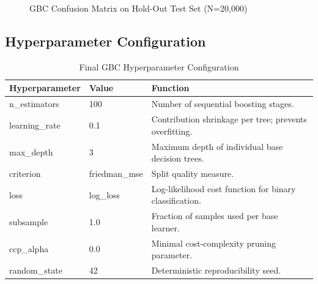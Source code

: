 \documentclass[12pt,a4paper]{report}
\begin{document}
\begin{figure}[H]
\centering
{}
\caption{GBC Confusion Matrix on Hold-Out Test Set (N=20,000)}
\label{fig:confusion_matrix}
\end{figure}

\subsection{Hyperparameter Configuration}
\begin{table}[H]
\centering
\caption{Final GBC Hyperparameter Configuration}
\label{tab:hyperparameters}
\begin{tabular}{lll}
\toprule
\textbf{Hyperparameter} & \textbf{Value} & \textbf{Function} \\
\midrule
n\_estimators    & 100          & Number of sequential boosting stages. \\
learning\_rate   & 0.1          & Contribution shrinkage per tree; prevents overfitting. \\
max\_depth       & 3            & Maximum depth of individual base decision trees. \\
criterion        & friedman\_mse & Split quality measure. \\
loss             & log\_loss    & Log-likelihood cost function for binary classification. \\
subsample        & 1.0          & Fraction of samples used per base learner. \\
ccp\_alpha       & 0.0          & Minimal cost-complexity pruning parameter. \\
random\_state    & 42           & Deterministic reproducibility seed. \\
\bottomrule
\end{tabular}
\end{table}
\end{document}
